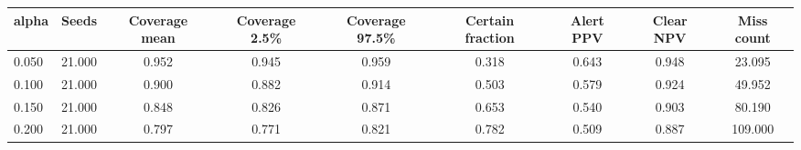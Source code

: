 \begin{tabular}{@{}lcccccccc@{}}
\toprule
alpha & Seeds & Coverage mean & Coverage 2.5\% & Coverage 97.5\% & Certain fraction & Alert PPV & Clear NPV & Miss count\\
\midrule
0.050 & 21.000 & 0.952 & 0.945 & 0.959 & 0.318 & 0.643 & 0.948 & 23.095\\
0.100 & 21.000 & 0.900 & 0.882 & 0.914 & 0.503 & 0.579 & 0.924 & 49.952\\
0.150 & 21.000 & 0.848 & 0.826 & 0.871 & 0.653 & 0.540 & 0.903 & 80.190\\
0.200 & 21.000 & 0.797 & 0.771 & 0.821 & 0.782 & 0.509 & 0.887 & 109.000\\
\bottomrule
\end{tabular}
